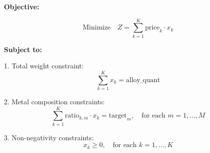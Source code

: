 \documentclass{article}
\begin{document}
\textbf{Objective:}

\[
\text{Minimize} \quad Z = \sum_{k=1}^{K} \text{price}_k \cdot x_k
\]

\textbf{Subject to:}

1. Total weight constraint:
\[
\sum_{k=1}^{K} x_k = \text{alloy\_quant}
\]

2. Metal composition constraints:
\[
\sum_{k=1}^{K} \text{ratio}_{k,m} \cdot x_k = \text{target}_m, \quad \text{for each } m = 1, \dots, M
\]

3. Non-negativity constraints:
\[
x_k \geq 0, \quad \text{for each } k = 1, \dots, K
\]
\end{document}
